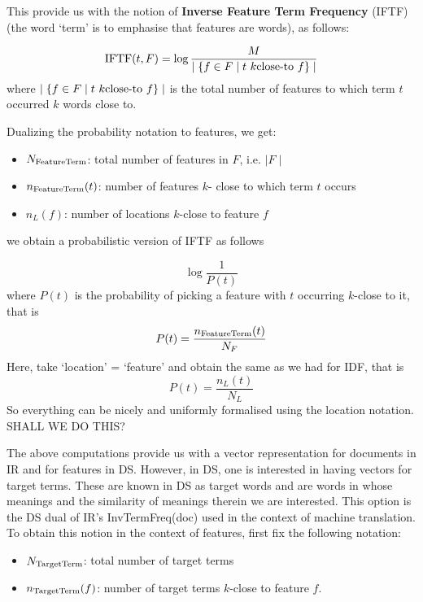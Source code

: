This provide  us with the notion of {\bf Inverse Feature Term Frequency}  (IFTF)  (the word `term'  is to emphasise that features are words),   as follows:

\begin{equation}
\label{iftf}
\textmd{IFTF}(t, F) = \log{{M} \over {\mid \{f \in F \mid t  \ k\textmd{close-to} \ f \} \mid}}
\end{equation}
where $\mid \{f \in F \mid t  \ k\textmd{close-to} \ f \} \mid$ is the total number of features to which term $t$ occurred $k$ words close to. 


Dualizing the  probability notation to  features, we get:

\begin{itemize}
\item $N_{\textmd{FeatureTerm}}$: total number of features in $F$, i.e. $\mid F \mid$
\item  $n_{\textmd{FeatureTerm}} (t)$: number of features $k$- close to which term $t$ occurs
\item  $n_L(f)$: number of locations $k$-close to feature $f$
\end{itemize}

we obtain a probabilistic version of IFTF as follows

\[
 \log{\frac{1}{P(t)}}
\]
where   $P(t)$ is the probability of picking a feature with $t$ occurring $k$-close to it, that is
\[
P(t) = \frac{n_{\textmd{FeatureTerm}}(t)}{N_F}
\]
Here,  take `location' = `feature' and obtain the same as we had  for IDF, that is 
\[
P(t) = \frac{n_L(t)}{N_L}
\]
So everything can be nicely and uniformly formalised using the location notation. SHALL WE DO THIS?

\medskip
The above computations provide us with a vector representation for documents in IR and for features in DS. However, in DS, one is interested in having vectors for target terms. These are known in DS as target words and  are words in whose meanings and the similarity of meanings therein we are interested.  This  option is the DS dual of IR's  InvTermFreq(doc) used in the context of machine translation. To obtain this notion in the context of features, first fix the following notation: 


\begin{itemize}
\item $N_{\textmd{TargetTerm}}$: total number of target terms
\item  $n_{\textmd{TargetTerm}}(f)$: number of target terms  $k$-close to feature $f$.
\end{itemize}

